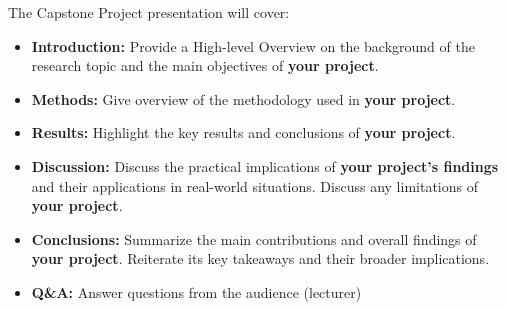 \begin{frame}{The Capstone Project presentation will cover:}
    \begin{itemize}
        \small
        \item \textbf{Introduction:} Provide a High-level Overview on the background of the research topic and the main objectives of \textbf{your project}.
        \item \textbf{Methods:} Give overview of the methodology used in \textbf{your project}.
        \item \textbf{Results:} Highlight the key results and conclusions of \textbf{your project}.
        \item \textbf{Discussion:} Discuss the practical implications of \textbf{your project's findings} and their applications in real-world situations. Discuss any limitations of \textbf{your project}.
        \item \textbf{Conclusions:} Summarize the main contributions and overall findings of \textbf{your project}. Reiterate its key takeaways and their broader implications.
        \item \textbf{Q\&A:} Answer questions from the audience (lecturer) 
    \end{itemize}
\end{frame}


